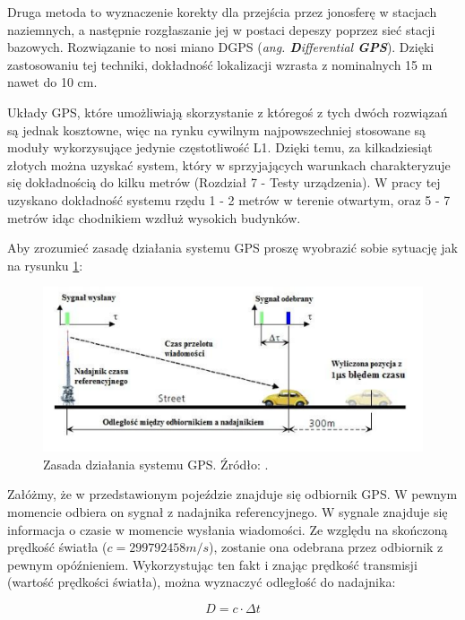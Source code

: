 Druga metoda to wyznaczenie korekty dla przejścia przez jonosferę w stacjach naziemnych, a następnie rozgłaszanie jej w postaci depeszy poprzez sieć stacji bazowych. Rozwiązanie to nosi miano DGPS (\textit{ang. \textbf{D}ifferential \textbf{GPS}}). Dzięki zastosowaniu tej techniki, dokładność lokalizacji wzrasta z nominalnych 15 m nawet do 10 cm.

Układy GPS, które umożliwiają skorzystanie z któregoś z tych dwóch rozwiązań są jednak kosztowne, więc na rynku cywilnym najpowszechniej stosowane są moduły wykorzysujące jedynie częstotliwość L1. Dzięki temu, za kilkadziesiąt złotych można uzyskać system, który w sprzyjających warunkach charakteryzuje się dokładnością do kilku metrów \cite{inzynierka}(Rozdział 7 - Testy urządzenia). W pracy tej uzyskano dokładność systemu rzędu 1 - 2 metrów w terenie otwartym, oraz 5 - 7 metrów idąc chodnikiem wzdłuż wysokich budynków.

Aby zrozumieć zasadę działania systemu GPS proszę wyobrazić sobie sytuację jak na rysunku \ref{fig:image_gps_basics1}:

\begin{figure}[H]
	\centering
	\includegraphics[width=12cm]{img/theory/GPS/gps_basics1.png}
	\caption{Zasada działania systemu GPS. Źródło: \cite{inzynierka}.}
	\label{fig:image_gps_basics1}
\end{figure}

Załóżmy, że w przedstawionym pojeździe znajduje się odbiornik GPS. W pewnym momencie odbiera on sygnał z nadajnika referencyjnego. W sygnale znajduje się informacja o czasie w momencie wysłania wiadomości. Ze względu na skończoną prędkość światła ($c = 299 792 458 m/s$), zostanie ona odebrana przez odbiornik z pewnym opóźnieniem. Wykorzystując ten fakt i znając prędkość transmisji (wartość prędkości światła), można wyznaczyć odległość do nadajnika:

\begin{equation}
	D = c \cdot \Delta t
\end{equation}

